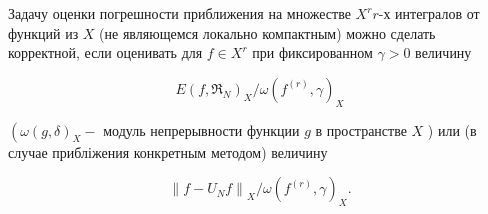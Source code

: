\documentclass[10pt]{article}
\begin{document}
Задачу оценки погрешности приближения на множестве $X^{r} r$-х интегралов от функций из $X$ (не являющемся локально компактным) можно сделать корректной, если оценивать для $f \in X^{r}$ при фиксированном $\gamma>0$ величину



\[

E\left(f, \mathfrak{\Re}_{N}\right)_{X} / \omega\left(f^{(r)}, \gamma\right)_{X}

\]



$\left(\omega(g, \delta)_{X}-\right.$ модуль непрерывности функции $g$ в пространстве $X$ ) или (в случае прибліжения конкретным методом) величину



\[

\left\|f-U_{N} f\right\|_{X} / \omega\left(f^{(r)}, \gamma\right)_{X} .

\]
\end{document}
